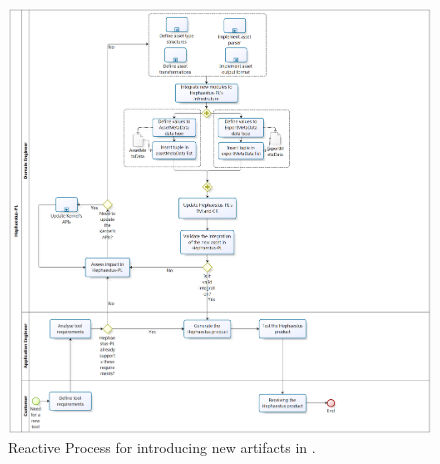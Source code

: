 \begin{figure}[bth]
\begin{center}
\includegraphics[scale=0.35]{imagens/process.png}
\end{center}
\caption{Reactive Process for introducing new artifacts in \hpl.}
\label{fig:process}
\end{figure}

%
%
%
%
%
